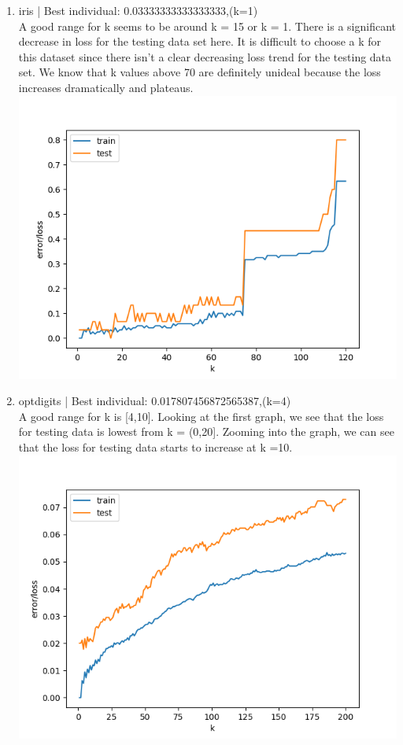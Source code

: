 \documentclass[12pt]{article}
\newcommand{\nextproblem}{
	\vfill
	\pagebreak
}
\begin{document}
\begin{enumerate}[noitemsep,topsep=1pt]
\begin{enumerate}[noitemsep,topsep=1pt]
\begin{enumerate}[noitemsep,topsep=1pt]
        \nextproblem
        \item iris | Best individual: 0.03333333333333333,(k=1)
        \\ A good range for k seems to be around k = 15 or k = 1. There is a significant decrease in loss for the
        testing data set here. It is difficult to choose a k for this dataset since there isn't a clear
        decreasing loss trend for the testing data set. We know that k values above 70 are definitely 
        unideal because the loss increases dramatically and plateaus.
        \\ \includegraphics[height=0.5\textheight]{iris_euc}
        \nextproblem
        \item optdigits | Best individual: 0.017807456872565387,(k=4)
        \\ A good range for k is [4,10]. Looking at the first graph, we see that the loss for testing data
        is lowest from k = (0,20]. Zooming into the graph, we can see that the loss for testing data starts
        to increase at k =10.
        \\ \includegraphics[height=0.4\textheight]{digits_euc}

\end{enumerate}
\end{enumerate}
\end{enumerate}
\end{document}
